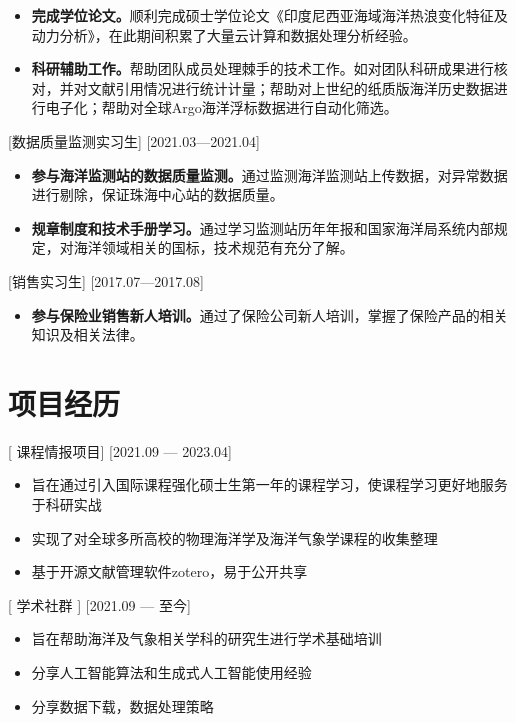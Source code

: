 \documentclass{resume}
\begin{document}
\begin{itemize}
  \item \textbf{完成学位论文。}顺利完成硕士学位论文《印度尼西亚海域海洋热浪变化特征及动力分析》，在此期间积累了大量云计算和数据处理分析经验。
    \item \textbf{科研辅助工作。}帮助团队成员处理棘手的技术工作。如对团队科研成果进行核对，并对文献引用情况进行统计计量；帮助对上世纪的纸质版海洋历史数据进行电子化；帮助对全球Argo海洋浮标数据进行自动化筛选。
\end{itemize}

[数据质量监测实习生]
[2021.03—2021.04] 

\begin{itemize}
  \item \textbf{参与海洋监测站的数据质量监测。}通过监测海洋监测站上传数据，对异常数据进行剔除，保证珠海中心站的数据质量。
  \item \textbf{规章制度和技术手册学习。}通过学习监测站历年年报和国家海洋局系统内部规定，对海洋领域相关的国标，技术规范有充分了解。
\end{itemize}

[销售实习生]
[2017.07—2017.08] 

\begin{itemize}
  \item \textbf{参与保险业销售新人培训。}通过了保险公司新人培训，掌握了保险产品的相关知识及相关法律。
\end{itemize}

\section{项目经历}

[ 课程情报项目]
[2021.09 — 2023.04]
\begin{itemize}
  \item 旨在通过引入国际课程强化硕士生第一年的课程学习，使课程学习更好地服务于科研实战
  \item 实现了对全球多所高校的物理海洋学及海洋气象学课程的收集整理
  \item 基于开源文献管理软件zotero，易于公开共享
\end{itemize}



[ 学术社群 ]
[2021.09 — 至今]
\begin{itemize}
  \item 旨在帮助海洋及气象相关学科的研究生进行学术基础培训
  \item 分享人工智能算法和生成式人工智能使用经验
  \item 分享数据下载，数据处理策略
\end{itemize}
\end{document}
